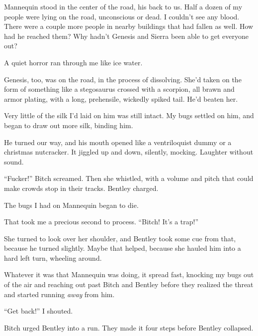 Mannequin stood in the center of the road, his back to us.  Half a dozen of my people were lying on the road, unconscious or dead.  I couldn't see any blood.  There were a couple more people in nearby buildings that had fallen as well.  How had he reached them?  Why hadn't Genesis and Sierra been able to get everyone out?



A quiet horror ran through me like ice water.



Genesis, too, was on the road, in the process of dissolving.  She'd taken on the form of something like a stegosaurus crossed with a scorpion, all brawn and armor plating, with a long, prehensile, wickedly spiked tail.  He'd beaten her.



Very little of the silk I'd laid on him was still intact.  My bugs settled on him, and began to draw out more silk, binding him.



He turned our way, and his mouth opened like a ventriloquist dummy or a christmas nutcracker.  It jiggled up and down, silently, mocking.  Laughter without sound.



``Fucker!'' Bitch screamed.  Then she whistled, with a volume and pitch that could make crowds stop in their tracks.  Bentley charged.



The bugs I had on Mannequin began to die.



That took me a precious second to process.  ``Bitch!  It's a trap!''



She turned to look over her shoulder, and Bentley took some cue from that, because he turned slightly.  Maybe that helped, because she hauled him into a hard left turn, wheeling around.



Whatever it was that Mannequin was doing, it spread fast, knocking my bugs out of the air and reaching out past Bitch and Bentley before they realized the threat and started running \emph{away} from him.



``Get back!'' I shouted.



Bitch urged Bentley into a run.  They made it four steps before Bentley collapsed.



